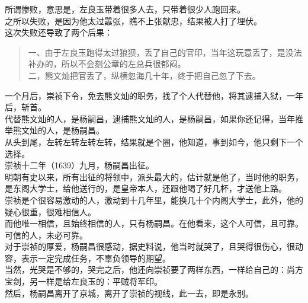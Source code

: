 \begin{multicols}{\theparacolNo}
所谓惨败，意思是，左良玉带着很多人去，只带着很少人跑回来。\\

之所以失败，是因为他太过嚣张，瞧不上张献忠，结果被人打了埋伏。\\

这次失败还导致了两个后果：\\

{\footnotesize \begin{quote}
	一、由于左良玉跑得太过狼狈，丢了自己的官印，当年这玩意丢了，是没法补办的，所以不会刻公章的左总兵很郁闷。\\
	二，熊文灿把官丢了，纵横忽海几十年，终于把自己忽了下去。\\
\end{quote}}

一个月后，崇祯下令，免去熊文灿的职务，找了个人代替他，将其逮捕入狱，一年后，斩首。\\

代替熊文灿的人，是杨嗣昌，逮捕熊文灿的人，是杨嗣昌，如果你还记得，当年推举熊文灿的人，是杨嗣昌。\\

从头到尾，左转左转左转左转，结果就是个圈，他知道，事到如今，他只剩下一个选择。\\

崇祯十二年（1639）九月，杨嗣昌出征。\\

明朝有史以来，所有出征的将领中，派头最大的，估计就是他了，当时他的职务，是东阁大学士，给他送行的，是皇帝本人，还跟他喝了好几杯，才送他上路。\\

崇祯是个很容易激动的人，激动到十几年里，能换几十个内阁大学士，此外，他的疑心很重，很难相信人。\\

而他唯一相信，且始终相信的人，只有杨嗣昌。在他看来，这个人可信，且可靠。\\

可信的人，未必可靠。\\

对于崇祯的厚爱，杨嗣昌很感动，据史料说，他当时就哭了，且哭得很伤心，很动容，表示一定完成任务，不辜负领导的期望。\\

当然，光哭是不够的，哭完之后，他还向崇祯要了两样东西，一样给自己的：尚方宝剑，另一样是给左良玉的：平贼将军印。\\

然后，杨嗣昌离开了京城，离开了崇祯的视线，此一去，即是永别。\\


\end{multicols}
